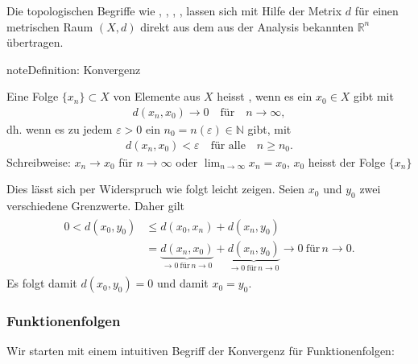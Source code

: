 \documentclass[letterpaper,10pt,english]{jupyterBook}
\begin{document}
Die topologischen Begriffe wie , , , ,  lassen sich mit Hilfe der Metrix \(d\) für einen metrischen Raum \((X,d)\) direkt aus dem aus der Analysis bekannten \(\mathbb{R}^n\) übertragen.

\begin{sphinxadmonition}{note}{Definition: Konvergenz}

Eine Folge \(\{x_n\}\subset X\) von Elemente aus \(X\) heisst , wenn es ein \(x_0\in X\) gibt mit
\begin{equation*}
\begin{split}d(x_n,x_0) \to 0\quad \text{für}\quad n\to\infty,\end{split}
\end{equation*}
dh. wenn es zu jedem \(\varepsilon > 0\) ein \(n_0 = n(\varepsilon)\in\mathbb{N}\) gibt, mit
\begin{equation*}
\begin{split}d(x_n,x_0) < \varepsilon\quad\text{für alle}\quad n\ge n_0.\end{split}
\end{equation*}
Schreibweise: \(x_n \to x_0\) für \(n \to \infty\) oder \(\lim_{n\to\infty} x_n = x_0\), \(x_0\) heisst  der Folge \(\{x_n\}\)
\end{sphinxadmonition}

 Dies lässt sich per Widerspruch wie folgt leicht zeigen. Seien \(x_0\) und \(y_0\) zwei verschiedene Grenzwerte. Daher gilt
\begin{equation*}
\begin{split}\begin{split}
0 < d(x_0,y_0) & \le d(x_0, x_n) + d(x_n,y_0)\\
& = \underbrace{d(x_n,x_0)}_{\to 0\ \text{für}\, n\to 0} + \underbrace{d(x_n,y_0)}_{\to 0\ \text{für}\, n\to 0} \to 0\ \text{für}\, n\to 0.\end{split}\end{split}
\end{equation*}
Es folgt damit \(d(x_0,y_0)=0\) und damit \(x_0 = y_0\).


\subsubsection{Funktionenfolgen}
\label{\detokenize{Funktionalanalysis/Funktionalanalysis:funktionenfolgen}}
Wir starten mit einem intuitiven Begriff der Konvergenz für Funktionenfolgen:
\end{document}
